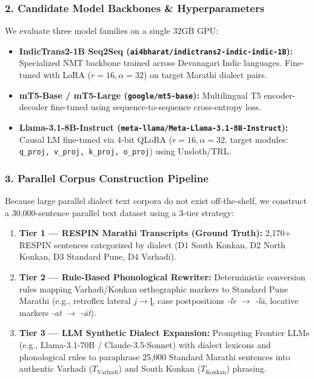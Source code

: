 \documentclass[11pt]{article}
\begin{document}
\subsubsection{2. Candidate Model Backbones \& Hyperparameters}
We evaluate three model families on a single 32GB GPU:
\begin{itemize}[leftmargin=*]
  \item \textbf{IndicTrans2-1B Seq2Seq (\texttt{ai4bharat/indictrans2-indic-indic-1B}):} Specialized NMT backbone trained across Devanagari Indic languages. Fine-tuned with LoRA ($r=16, \alpha=32$) on target Marathi dialect pairs.
  \item \textbf{mT5-Base / mT5-Large (\texttt{google/mt5-base}):} Multilingual T5 encoder-decoder fine-tuned using sequence-to-sequence cross-entropy loss.
  \item \textbf{Llama-3.1-8B-Instruct (\texttt{meta-llama/Meta-Llama-3.1-8B-Instruct}):} Causal LM fine-tuned via 4-bit QLoRA ($r=16, \alpha=32$, target modules: \texttt{q\_proj, v\_proj, k\_proj, o\_proj}) using Unsloth/TRL.
\end{itemize}

\subsubsection{3. Parallel Corpus Construction Pipeline}
Because large parallel dialect text corpora do not exist off-the-shelf, we construct a 30,000-sentence parallel text dataset using a 3-tier strategy:
\begin{enumerate}[leftmargin=*]
  \item \textbf{Tier 1 --- RESPIN Marathi Transcripts (Ground Truth):} 2,170+ RESPIN sentences categorized by dialect (D1 South Konkan, D2 North Konkan, D3 Standard Pune, D4 Varhadi).
  \item \textbf{Tier 2 --- Rule-Based Phonological Rewriter:} Deterministic conversion rules mapping Varhadi/Konkan orthographic markers to Standard Pune Marathi (e.g., retroflex lateral $j \to \text{ɭ}$, case postpositions \textit{-le} $\to$ \textit{-lā}, locative markers \textit{-at} $\to$ \textit{-āt}).
  \item \textbf{Tier 3 --- LLM Synthetic Dialect Expansion:} Prompting Frontier LLMs (e.g., Llama-3.1-70B / Claude-3.5-Sonnet) with dialect lexicons and phonological rules to paraphrase 25,000 Standard Marathi sentences into authentic Varhadi ($T_{\text{Varhadi}}$) and South Konkan ($T_{\text{Konkan}}$) phrasing.
\end{enumerate}
\end{document}
